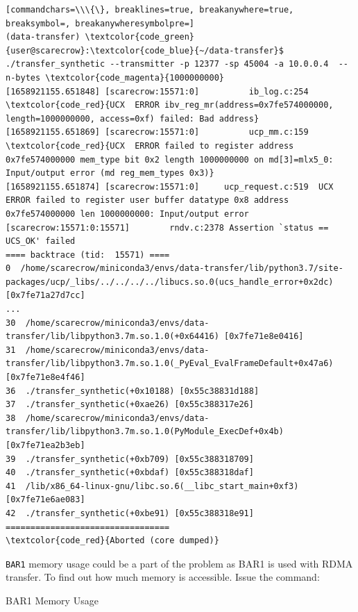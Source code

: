\documentclass[a4paper,onecolumn]{article}
\begin{document}
\begin{Verbatim}[commandchars=\\\{\}, breaklines=true, breakanywhere=true, breaksymbol=, breakanywheresymbolpre=]
(data-transfer) \textcolor{code_green}{user@scarecrow}:\textcolor{code_blue}{~/data-transfer}$ ./transfer_synthetic --transmitter -p 12377 -sp 45004 -a 10.0.0.4  --n-bytes \textcolor{code_magenta}{1000000000}
[1658921155.651848] [scarecrow:15571:0]          ib_log.c:254  \textcolor{code_red}{UCX  ERROR ibv_reg_mr(address=0x7fe574000000, length=1000000000, access=0xf) failed: Bad address}
[1658921155.651869] [scarecrow:15571:0]          ucp_mm.c:159  \textcolor{code_red}{UCX  ERROR failed to register address 0x7fe574000000 mem_type bit 0x2 length 1000000000 on md[3]=mlx5_0: Input/output error (md reg_mem_types 0x3)}
[1658921155.651874] [scarecrow:15571:0]     ucp_request.c:519  UCX  ERROR failed to register user buffer datatype 0x8 address 0x7fe574000000 len 1000000000: Input/output error
[scarecrow:15571:0:15571]        rndv.c:2378 Assertion `status == UCS_OK' failed
==== backtrace (tid:  15571) ====
0  /home/scarecrow/miniconda3/envs/data-transfer/lib/python3.7/site-packages/ucp/_libs/../../../../libucs.so.0(ucs_handle_error+0x2dc) [0x7fe71a27d7cc]
...
30  /home/scarecrow/miniconda3/envs/data-transfer/lib/libpython3.7m.so.1.0(+0x64416) [0x7fe71e8e0416]
31  /home/scarecrow/miniconda3/envs/data-transfer/lib/libpython3.7m.so.1.0(_PyEval_EvalFrameDefault+0x47a6) [0x7fe71e8e4f46]
36  ./transfer_synthetic(+0x10188) [0x55c38831d188]
37  ./transfer_synthetic(+0xae26) [0x55c388317e26]
38  /home/scarecrow/miniconda3/envs/data-transfer/lib/libpython3.7m.so.1.0(PyModule_ExecDef+0x4b)[0x7fe71ea2b3eb]
39  ./transfer_synthetic(+0xb709) [0x55c388318709]
40  ./transfer_synthetic(+0xbdaf) [0x55c388318daf]
41  /lib/x86_64-linux-gnu/libc.so.6(__libc_start_main+0xf3) [0x7fe71e6ae083]
42  ./transfer_synthetic(+0xbe91) [0x55c388318e91]
=================================
\textcolor{code_red}{Aborted (core dumped)}
\end{Verbatim}

\verb|BAR1| memory usage could be a part of the problem as BAR1 is used with RDMA transfer. To find out how much memory is accessible. Issue the command:

BAR1 Memory Usage
\end{document}
